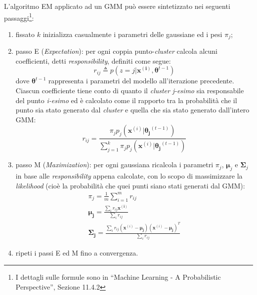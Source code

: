 L'algoritmo EM applicato ad un GMM può essere sintetizzato nei seguenti passaggi\footnote{I dettagli sulle formule sono in ``Machine Learning - A Probabilistic Perspective'', Sezione 11.4.2}:
\begin{enumerate}
    \item fissato $k$ inizializza casualmente i parametri delle gaussiane ed i pesi $\pi_j$;
    \item passo E (\emph{Expectation}): per ogni coppia punto-\emph{cluster} calcola alcuni coefficienti, detti \emph{responsibility}, definiti come segue:
        \begin{equation*}
r_{ij}\triangleq p(z=j | \mathbf{x^{(i)}}, \boldsymbol\theta^{t-1})
        \end{equation*}
 dove $\boldsymbol\theta^{t-1}$ rappresenta i parametri del modello all'iterazione precedente. Ciascun coefficiente tiene conto di quanto il \emph{cluster} \emph{j-esimo} sia responsabile del punto \emph{i-esimo} ed è calcolato come il rapporto tra la probabilità che il punto sia stato generato dal \emph{cluster} e quella che sia stato generato dall'intero GMM:
         \begin{equation*}
r_{ij} =\frac{\pi_j p_j(\mathbf{x}^{(i)} | \boldsymbol{\theta_j}^{(t-1)})}{ \sum_{j=1}^k \pi_j p_j(\mathbf{x}^{(i)}  | \boldsymbol{\theta_j}^{(t-1)})}
         \end{equation*}
    \item passo M (\emph{Maximization}): per ogni gaussiana ricalcola i parametri $\pi_j$, $\boldsymbol\mu_j$ e $\boldsymbol\Sigma_j$ in base alle \emph{responsibility} appena calcolate, con lo scopo di massimizzare la \emph{likelihood} (cioè la probabilità che quei punti siano stati generati dal GMM):
        \begin{gather*}
            \pi_j = \frac{1}{m} \sum_{i=1}^m r_{ij} \\
           \boldsymbol{\mu_j} = \frac{\sum_{i} r_{ij}\mathbf{x^{(i)}}}{\sum_{i} r_{ij}} \\
            \mathbf{\Sigma_j} = \frac{\sum_{i} r_{ij} (\mathbf{x}^{(i)} - \boldsymbol{\mu_j})(\mathbf{x}^{(i)} - \boldsymbol{\mu_j})^T} {\sum_{i} r_{ij}}
    \end{gather*}
\item ripeti i passi E ed M fino a convergenza.
\end{enumerate}

